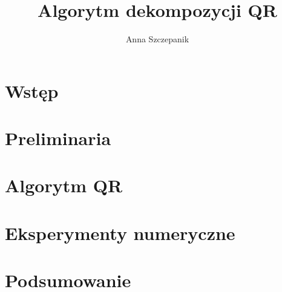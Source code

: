 \documentclass[10pt,a4paper]{report}
\author{Anna Szczepanik}
\title{Algorytm dekompozycji QR}
\begin{document}
\maketitle

\chapter{Wstęp}

\chapter{Preliminaria}

\chapter{Algorytm QR}

\chapter{Eksperymenty numeryczne}

\chapter{Podsumowanie}
\end{document}
